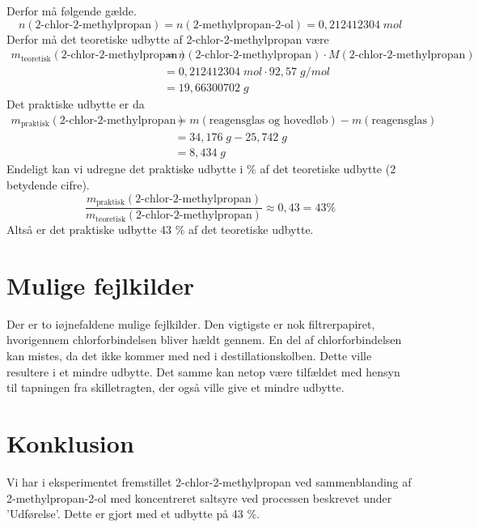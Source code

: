 \documentclass{report}
\begin{document}
Derfor må følgende gælde.
\[
n(\text{2-chlor-2-methylpropan})=n(\text{2-methylpropan-2-ol})= 0,212412304\;\unit{mol} 
\] 
Derfor må det teoretiske udbytte af 2-chlor-2-methylpropan være
\begin{equation*}
\begin{split}
  m_{\text{teoretisk}}(\text{2-chlor-2-methylpropan})&= n(\text{2-chlor-2-methylpropan}) \cdot M(\text{2-chlor-2-methylpropan})\\ 
  &= 0,212412304\;\unit{mol} \cdot 92,57 \;\unit{g/mol} \\ 
  &=19,66300702 \;\unit{g} 
\end{split}
\end{equation*}
Det praktiske udbytte er da
\begin{equation*}
\begin{split}
  m_{\text{praktisk}}(\text{2-chlor-2-methylpropan})&=m(\text{reagensglas og hovedløb})-m(\text{reagensglas})\\
  &= 34,176 \;\unit{g} - 25,742 \;\unit{g} \\ 
  &= 8,434 \;\unit{g} 
\end{split}
\end{equation*}
Endeligt kan vi udregne det praktiske udbytte i \% af det teoretiske udbytte (2 betydende cifre).
\[
\frac{m_{\text{praktisk}}(\text{2-chlor-2-methylpropan})}{m_{\text{teoretisk}}(\text{2-chlor-2-methylpropan})}\approx 0,43 = 43\%
\] 
Altså er det praktiske udbytte 43 \% af det teoretiske udbytte.

\section*{Mulige fejlkilder}
Der er to iøjnefaldene mulige fejlkilder.
Den vigtigste er nok filtrerpapiret, hvorigennem chlorforbindelsen bliver hældt gennem.
En del af chlorforbindelsen kan mistes, da det ikke kommer med ned i destillationskolben.
Dette ville resultere i et mindre udbytte.
Det samme kan netop være tilfældet med hensyn til tapningen fra skilletragten, der også ville give et mindre udbytte.

\section*{Konklusion}
Vi har i eksperimentet fremstillet 2-chlor-2-methylpropan ved sammenblanding af 2-methylpropan-2-ol med koncentreret saltsyre ved processen beskrevet under 'Udførelse'.
Dette er gjort med et udbytte på 43 \%.
\end{document}

